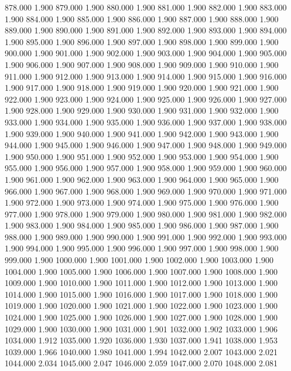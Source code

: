 878.000 1.900 
879.000 1.900 
880.000 1.900 
881.000 1.900 
882.000 1.900 
883.000 1.900 
884.000 1.900 
885.000 1.900 
886.000 1.900 
887.000 1.900 
888.000 1.900 
889.000 1.900 
890.000 1.900 
891.000 1.900 
892.000 1.900 
893.000 1.900 
894.000 1.900 
895.000 1.900 
896.000 1.900 
897.000 1.900 
898.000 1.900 
899.000 1.900 
900.000 1.900 
901.000 1.900 
902.000 1.900 
903.000 1.900 
904.000 1.900 
905.000 1.900 
906.000 1.900 
907.000 1.900 
908.000 1.900 
909.000 1.900 
910.000 1.900 
911.000 1.900 
912.000 1.900 
913.000 1.900 
914.000 1.900 
915.000 1.900 
916.000 1.900 
917.000 1.900 
918.000 1.900 
919.000 1.900 
920.000 1.900 
921.000 1.900 
922.000 1.900 
923.000 1.900 
924.000 1.900 
925.000 1.900 
926.000 1.900 
927.000 1.900 
928.000 1.900 
929.000 1.900 
930.000 1.900 
931.000 1.900 
932.000 1.900 
933.000 1.900 
934.000 1.900 
935.000 1.900 
936.000 1.900 
937.000 1.900 
938.000 1.900 
939.000 1.900 
940.000 1.900 
941.000 1.900 
942.000 1.900 
943.000 1.900 
944.000 1.900 
945.000 1.900 
946.000 1.900 
947.000 1.900 
948.000 1.900 
949.000 1.900 
950.000 1.900 
951.000 1.900 
952.000 1.900 
953.000 1.900 
954.000 1.900 
955.000 1.900 
956.000 1.900 
957.000 1.900 
958.000 1.900 
959.000 1.900 
960.000 1.900 
961.000 1.900 
962.000 1.900 
963.000 1.900 
964.000 1.900 
965.000 1.900 
966.000 1.900 
967.000 1.900 
968.000 1.900 
969.000 1.900 
970.000 1.900 
971.000 1.900 
972.000 1.900 
973.000 1.900 
974.000 1.900 
975.000 1.900 
976.000 1.900 
977.000 1.900 
978.000 1.900 
979.000 1.900 
980.000 1.900 
981.000 1.900 
982.000 1.900 
983.000 1.900 
984.000 1.900 
985.000 1.900 
986.000 1.900 
987.000 1.900 
988.000 1.900 
989.000 1.900 
990.000 1.900 
991.000 1.900 
992.000 1.900 
993.000 1.900 
994.000 1.900 
995.000 1.900 
996.000 1.900 
997.000 1.900 
998.000 1.900 
999.000 1.900 
1000.000 1.900 
1001.000 1.900 
1002.000 1.900 
1003.000 1.900 
1004.000 1.900 
1005.000 1.900 
1006.000 1.900 
1007.000 1.900 
1008.000 1.900 
1009.000 1.900 
1010.000 1.900 
1011.000 1.900 
1012.000 1.900 
1013.000 1.900 
1014.000 1.900 
1015.000 1.900 
1016.000 1.900 
1017.000 1.900 
1018.000 1.900 
1019.000 1.900 
1020.000 1.900 
1021.000 1.900 
1022.000 1.900 
1023.000 1.900 
1024.000 1.900 
1025.000 1.900 
1026.000 1.900 
1027.000 1.900 
1028.000 1.900 
1029.000 1.900 
1030.000 1.900 
1031.000 1.901 
1032.000 1.902 
1033.000 1.906 
1034.000 1.912 
1035.000 1.920 
1036.000 1.930 
1037.000 1.941 
1038.000 1.953 
1039.000 1.966 
1040.000 1.980 
1041.000 1.994 
1042.000 2.007 
1043.000 2.021 
1044.000 2.034 
1045.000 2.047 
1046.000 2.059 
1047.000 2.070 
1048.000 2.081 

